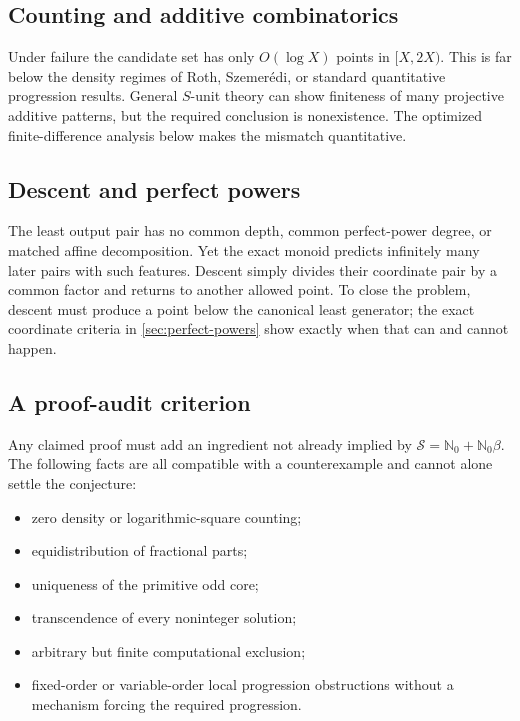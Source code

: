 \documentclass[11pt,oneside]{article}
\theoremstyle{definition}
\newcommand{\Nzero}{\mathbb N_0}
\newcommand{\Sol}{\mathcal S}
\begin{document}
\subsection{Counting and additive combinatorics}

Under failure the candidate set has only \(O(\log X)\) points in \([X,2X)\).  This is far
below the density regimes of Roth, Szemer\'edi, or standard quantitative progression
results.  General \(S\)-unit theory can show finiteness of many projective additive
patterns, but the required conclusion is nonexistence.  The optimized finite-difference
analysis below makes the mismatch quantitative.

\subsection{Descent and perfect powers}

The least output pair has no common depth, common perfect-power degree, or matched affine
decomposition.  Yet the exact monoid predicts infinitely many later pairs with such
features.  Descent simply divides their coordinate pair by a common factor and returns to
another allowed point.  To close the problem, descent must produce a point below the
canonical least generator; the exact coordinate criteria in \cref{sec:perfect-powers}
show exactly when that can and cannot happen.

\subsection{A proof-audit criterion}

Any claimed proof must add an ingredient not already implied by
\(\Sol=\Nzero+\Nzero\beta\).  The following facts are all compatible with a
counterexample and cannot alone settle the conjecture:
\begin{itemize}
\item zero density or logarithmic-square counting;
\item equidistribution of fractional parts;
\item uniqueness of the primitive odd core;
\item transcendence of every noninteger solution;
\item arbitrary but finite computational exclusion;
\item fixed-order or variable-order local progression obstructions without a mechanism
forcing the required progression.
\end{itemize}
\end{document}
